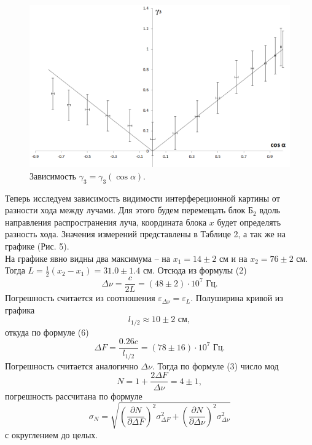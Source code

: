\documentclass[a4paper,12pt]{article}
\begin{document}
\begin{figure}[h]
\includegraphics[scale=0.6]{4.png}
\centering
\caption{Зависимость $\gamma_3 = \gamma_3(\cos \alpha)$.}
\end{figure}
Теперь исследуем зависимость видимости интерфереционной картины от разности хода между лучами. Для этого будем перемещать блок $\text{Б}_2$ вдоль направления распространения луча, координата блока $x$ будет определять разность хода. Значения измерений представлены в Таблице 2, а так же на графике (Рис. 5).\\
На графике явно видны два максимума -- на $x_1 = 14\pm 2 \text{ см}$ и на $x_2 = 76 \pm 2 \text{ см}$. Тогда $L = \frac{1}{2}(x_2 - x_1) = 31.0 \pm 1.4 \text{ см}$. Отсюда из формулы (2)
$$
\Delta \nu = \dfrac{c}{2L} = (48 \pm 2) \cdot 10^7 \text{ Гц}.
$$
Погрешность считается из соотношения $\varepsilon_{\Delta\nu} = \varepsilon_{L}$. Полуширина кривой из графика
$$
l_{1/2} \approx 10 \pm 2 \text{ см},
$$
откуда по формуле (6)
$$
\Delta F = \dfrac{0.26 c}{l_{1/2}} = (78 \pm 16) \cdot 10^7 \text{ Гц}.
$$
Погрешность считается аналогично $\Delta \nu$. Тогда по формуле (3) число мод
$$
N = 1 + \dfrac{2\Delta F}{\Delta \nu} = 4 \pm 1, 
$$
погрешность рассчитана по формуле 
$$
\sigma_N = \sqrt{\left( \dfrac{\partial N}{\partial \Delta F} \right)^2 \sigma^2_{\Delta F} + \left( \dfrac{\partial N}{\partial \Delta \nu} \right)^2 \sigma^2_{\Delta \nu}}
$$
с округлением до целых.
\end{document}
